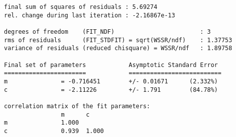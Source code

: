     \begin{verbatim}
final sum of squares of residuals : 5.69274
rel. change during last iteration : -2.16867e-13

degrees of freedom    (FIT_NDF)                        : 3
rms of residuals      (FIT_STDFIT) = sqrt(WSSR/ndf)    : 1.37753
variance of residuals (reduced chisquare) = WSSR/ndf   : 1.89758

Final set of parameters            Asymptotic Standard Error
=======================            ==========================
m               = -0.716451        +/- 0.01671      (2.332%)
c               = -2.11226         +/- 1.791        (84.78%)

correlation matrix of the fit parameters:
                m      c      
m               1.000 
c               0.939  1.000 
    \end{verbatim}